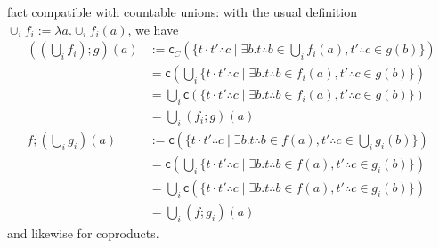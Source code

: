 \documentclass[acmsmall,screen,review]{acmart}
\newcommand{\ms}[1]{\ensuremath{\mathsf{#1}}}
\newcommand{\tret}[2]{#1 \therefore #2}
\begin{document}
fact compatible with countable unions: with the usual definition $\cup_i f_i := \lambda a . \cup_i
f_i(a)$, we have
\begin{align*}
  ((\bigcup_i f_i) ; g)(a) &:= \ms{c}_C(\{
    \tret{t \cdot t'}{c} \mid \exists b . \tret{t}{b} \in \bigcup_i f_i(a), \tret{t'}{c} \in g(b)
  \}) \\
  &= \ms{c}(\bigcup_i \{
      \tret{t \cdot t'}{c} \mid \exists b . \tret{t}{b} \in f_i(a), \tret{t'}{c} \in g(b)
    \}) \\
  &= \bigcup_i \ms{c}(\{
      \tret{t \cdot t'}{c} \mid \exists b . \tret{t}{b} \in f_i(a), \tret{t'}{c} \in g(b)
    \}) \\
  &= \bigcup_i (f_i ; g)(a)
  \\
  f ; (\bigcup_i g_i)(a) &:= \ms{c}(\{
    \tret{t \cdot t'}{c} \mid \exists b . \tret{t}{b} \in f(a), \tret{t'}{c} \in \bigcup_i g_i(b)
  \}) \\
  &= \ms{c}(\bigcup_i \{
    \tret{t \cdot t'}{c} \mid \exists b . \tret{t}{b} \in f(a), \tret{t'}{c} \in g_i(b)
  \}) \\
  &= \bigcup_i \ms{c}(\{
    \tret{t \cdot t'}{c} \mid \exists b . \tret{t}{b} \in f(a), \tret{t'}{c} \in g_i(b)
  \}) \\
  &= \bigcup_i (f ; g_i)(a)
\end{align*}
and likewise for coproducts.
\end{document}
